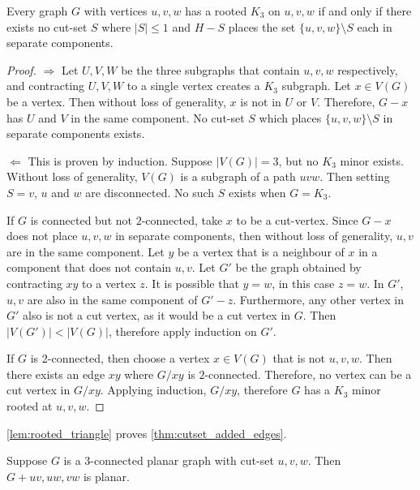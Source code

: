 \begin{lemma}\label{lem:rooted_triangle}
	Every graph $G$ with vertices $u, v, w$ has a rooted $K_3$ on $u, v, w$ if and only if there exists no cut-set $S$ where $|S| \leq 1$ and $H - S$ places the set $\{u,v,w\} \setminus S$ each in separate components. 
\end{lemma}
\begin{proof}
	$\Rightarrow$ Let $U,V,W$ be the three subgraphs that contain $u, v, w$ respectively, and contracting $U, V, W$ to a single vertex creates a $K_3$ subgraph. Let $x \in V(G)$ be a vertex. Then without loss of generality, $x$ is not in $U$ or $V$. Therefore, $G - x$ has $U$ and $V$ in the same component. No cut-set $S$ which places $\{u,v,w\} \setminus S$ in separate components exists. 

	$\Leftarrow$ This is proven by induction. Suppose $|V(G)| = 3$, but no $K_3$ minor exists. Without loss of generality, $V(G)$ is a subgraph of a path $uvw$. Then setting $S = v$, $u$ and $w$ are disconnected. No such $S$ exists when $G = K_3$. 

	If $G$ is connected but not $2$-connected, take $x$ to be a cut-vertex. Since $G - x$ does not place $u,v,w$ in separate components, then without loss of generality, $u,v$ are in the same component. Let $y$ be a vertex that is a neighbour of $x$ in a component that does not contain $u,v$. Let $G'$ be the graph obtained by contracting $xy$ to a vertex $z$. It is possible that $y = w$, in this case $z = w$. In $G'$, $u,v$ are also in the same component of $G' - z$. Furthermore, any other vertex in $G'$ also is not a cut vertex, as it would be a cut vertex in $G$. Then $|V(G')| < |V(G)|$, therefore apply induction on $G'$. 

	If $G$ is 2-connected, then choose a vertex $x \in V(G)$ that is not $u,v,w$. Then there exists an edge $xy$ where $G/xy$ is $2$-connected. Therefore, no vertex can be a cut vertex in $G/xy$. Applying induction, $G/xy$, therefore $G$ has a $K_3$ minor rooted at $u,v,w$.
\end{proof}


\cref{lem:rooted_triangle} proves \cref{thm:cutset_added_edges}. 

\begin{lemma}\label{thm:cutset_added_edges}
	Suppose $G$ is a $3$-connected planar graph with cut-set $u,v,w$. Then $G + uv, uw, vw$ is planar. 
\end{lemma}

